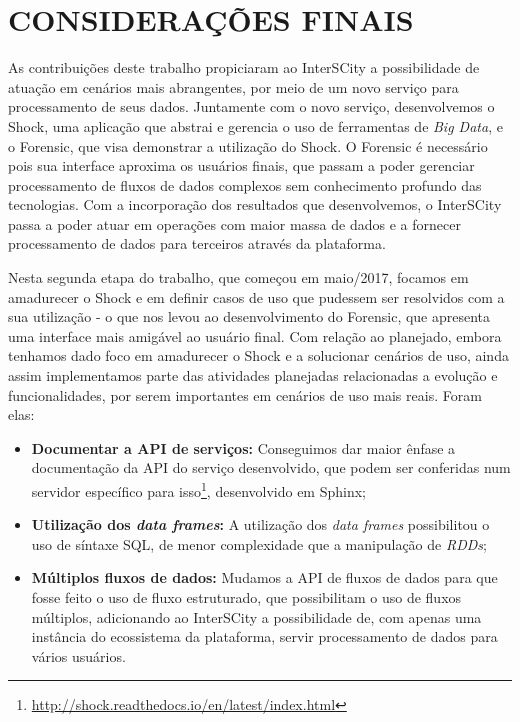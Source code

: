 \chapter{CONSIDERAÇÕES FINAIS}
\label{chapter:final}

As contribuições deste trabalho propiciaram ao InterSCity a possibilidade de
atuação em cenários mais abrangentes, por meio de um novo serviço
para processamento de seus dados. Juntamente com o novo serviço, desenvolvemos
o Shock, uma aplicação que abstrai e gerencia o uso de ferramentas de
\textit{Big Data}, e o Forensic, que visa demonstrar a utilização do Shock.
O Forensic é necessário pois sua interface aproxima os usuários finais, que
passam a poder gerenciar processamento de fluxos de dados complexos sem
conhecimento profundo das tecnologias.
Com a incorporação dos resultados que desenvolvemos, o InterSCity passa a poder
atuar em operações com maior massa de dados e a fornecer processamento de dados
para terceiros através da plataforma.

Nesta segunda etapa do trabalho, que começou em maio/2017, focamos em
amadurecer o Shock e em definir casos de uso que pudessem ser resolvidos com
a sua utilização - o que nos levou ao desenvolvimento do Forensic, que apresenta
uma interface mais amigável ao usuário final. Com relação ao planejado, embora
tenhamos dado foco em amadurecer o Shock e a solucionar cenários de uso, ainda
assim implementamos parte das atividades planejadas relacionadas a evolução e
funcionalidades, por serem importantes em cenários de uso mais reais. Foram
elas:

\begin{itemize}
    \item \textbf{Documentar a API de serviços:} Conseguimos dar maior ênfase a
        documentação da API do serviço desenvolvido, que podem ser conferidas
        num servidor específico para
        isso\footnote{\url{http://shock.readthedocs.io/en/latest/index.html}},
        desenvolvido em Sphinx;
    \item \textbf{Utilização dos \textit{data frames}:} A utilização dos
        \textit{data frames} possibilitou o uso de síntaxe SQL, de menor
        complexidade que a manipulação de \textit{RDDs};
    \item \textbf{Múltiplos fluxos de dados:} Mudamos a API de fluxos de dados
        para que fosse feito o uso de fluxo estruturado, que
        possibilitam o uso de fluxos múltiplos, adicionando ao
        InterSCity a possibilidade de, com apenas uma instância do ecossistema
        da plataforma, servir processamento de dados para vários usuários.
\end{itemize}

